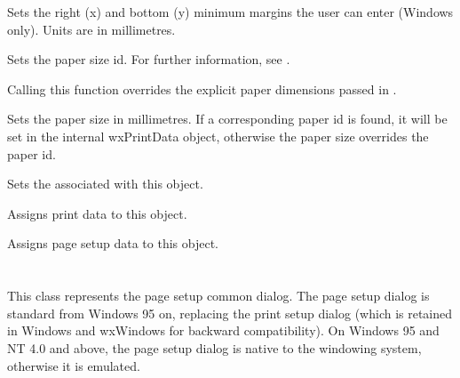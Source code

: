 
Sets the right (x) and bottom (y) minimum margins the user can enter (Windows only). Units are
in millimetres.

\label{wxpagesetupdialogdatasetpaperid}


Sets the paper size id. For further information, see .

Calling this function overrides the explicit paper dimensions passed in .

\label{wxpagesetupdialogdatasetpapersize}


Sets the paper size in millimetres. If a corresponding paper id is found, it will be set in the
internal wxPrintData object, otherwise the paper size overrides the paper id.

\label{wxpagesetupdialogdatasetprintdata}


Sets the  associated with this object.

\label{wxpagesetupdialogdataassign}


Assigns print data to this object.


Assigns page setup data to this object.

\section{}\label{wxpagesetupdialog}

This class represents the page setup common dialog. The page setup dialog is standard from
Windows 95 on, replacing the print setup dialog (which is retained in Windows and wxWindows
for backward compatibility). On Windows 95 and NT 4.0 and above, the page setup dialog is
native to the windowing system, otherwise it is emulated.

